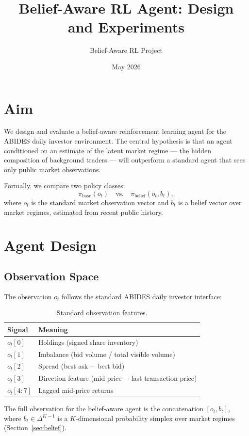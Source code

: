 \documentclass[11pt]{article}
\title{Belief-Aware RL Agent: Design and Experiments}
\author{Belief-Aware RL Project}
\date{May 2026}
\begin{document}
\maketitle

\section{Aim}

We design and evaluate a belief-aware reinforcement learning agent for the ABIDES daily investor
environment. The central hypothesis is that an agent conditioned on an estimate of the latent
market regime --- the hidden composition of background traders --- will outperform a standard agent
that sees only public market observations.

Formally, we compare two policy classes:
\[
\pi_{\text{base}}(o_t) \quad \text{vs.} \quad \pi_{\text{belief}}(o_t, b_t),
\]
where $o_t$ is the standard market observation vector and $b_t$ is a belief vector over market
regimes, estimated from recent public history.

\section{Agent Design}

\subsection{Observation Space}

The observation $o_t$ follows the standard ABIDES daily investor interface:

\begin{table}[h]
\centering
\begin{tabular}{ll}
\toprule
\textbf{Signal} & \textbf{Meaning} \\
\midrule
$o_t[0]$ & Holdings (signed share inventory) \\
$o_t[1]$ & Imbalance (bid volume / total visible volume) \\
$o_t[2]$ & Spread (best ask $-$ best bid) \\
$o_t[3]$ & Direction feature (mid price $-$ last transaction price) \\
$o_t[4{:}7]$ & Lagged mid-price returns \\
\bottomrule
\end{tabular}
\caption{Standard observation features.}
\end{table}

The full observation for the belief-aware agent is the concatenation $[o_t, b_t]$, where $b_t \in
\Delta^{K-1}$ is a $K$-dimensional probability simplex over market regimes (Section~\ref{sec:belief}).
\end{document}
